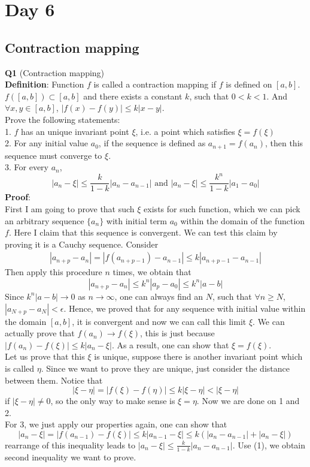 \documentclass{article}
\newcommand{\tb}[1]{\textbf{#1}}
\begin{document}
\section{Day 6}
\subsection{Contraction mapping}
\tb{Q1} (Contraction mapping)\\
\tb{Definition}: Function $f$ is called a contraction mapping if $f$ is defined on $[a,b]$. $f([a,b])\subset [a,b]$ and there exists a constant $k$, 
such that $0<k<1$. And $\forall x,y \in [a,b]$, $|f(x)-f(y)| \leq k |x-y|$.\\
Prove the following statements:\\
1. $f$ has an unique invariant point $\xi$, i.e. a point which satisfies $\xi = f(\xi)$\\
2. For any initial value $a_0$, if the sequence is defined as $a_{n+1}=f(a_n)$, then this sequence must converge to $\xi$.\\
3. For every $a_n$,
$$
|a_n - \xi| \leq \frac{k}{1-k} |a_n - a_{n-1}| \text{ \ \ and \ \ } |a_n - \xi |\leq \frac{k^n}{1-k} |a_1-a_0|
$$
\tb{Proof}:\\
First I am going to prove that such $\xi$ exists for such function, which we can pick an arbitrary sequence $\{a_n\}$ with initial term $a_0$ within the domain of the function $f$.
Here I claim that this sequence is convergent. We can test this claim by proving it is a Cauchy sequence. Consider
\begin{align}
|a_{n+p}-a_{n}| = |f(a_{n+p-1}) - a_{n-1}| \leq k|a_{n+p-1}-a_{n-1}|
\end{align}
Then apply this procedure $n$ times, we obtain that
$$
|a_{n+p}-a_n| \leq k^n |a_{p}-a_0| \leq k^n |a-b|
$$
Since $k^n |a-b| \rightarrow 0$ as $n \rightarrow \infty$, one can always find an $N$, such that $\forall n \geq N$,
$|a_{N+p}- a_N| < \epsilon$. Hence, we proved that for any sequence with initial value within the domain $[a,b]$, it is convergent and now we can call this limit $\xi$.
We can actually prove that $f(a_n) \rightarrow f(\xi)$, this is just because $|f(a_n)-f(\xi)| \leq k|a_n - \xi|$. As a result, one can show that $\xi = f(\xi)$.\\
Let us prove that this $\xi$ is unique, suppose there is another invariant point which is called $\eta$. Since we want to prove they are unique, just consider the distance between them. 
Notice that 
$$
|\xi - \eta| = |f(\xi)- f(\eta)| \leq k|\xi -\eta| < |\xi - \eta|
$$
if $|\xi - \eta| \ne 0$, so the only way to make sense is $\xi = \eta$. Now we are done on 1 and 2.\\
For 3, we just apply our properties again, one can show that 
$$
|a_n - \xi| = |f(a_{n-1})-f(\xi)| \leq k|a_{n-1}-\xi| \leq k(|a_n - a_{n-1}| + |a_n-\xi|)
$$
rearrange of this inequality leads to $|a_n - \xi| \leq \frac{k}{1-k} |a_n - a_{n-1}|$. Use (1), we obtain second inequality we want to prove.\\
\\
\\
\\
\\
\\
\end{document}
